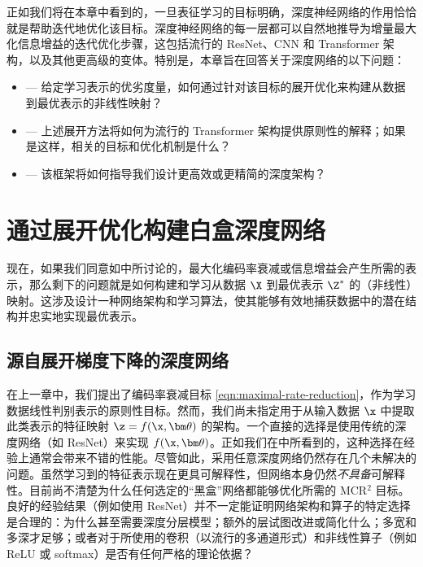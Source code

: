 \documentclass[../../book-main_zh.tex]{subfiles}
\begin{document}
正如我们将在本章中看到的，一旦表征学习的目标明确，深度神经网络的作用恰恰就是帮助迭代地优化该目标。深度神经网络的每一层都可以自然地推导为增量最大化信息增益的迭代优化步骤，这包括流行的 ResNet、CNN 和 Transformer 架构，以及其他更高级的变体。特别是，本章旨在回答关于深度网络的以下问题：
\begin{itemize}
    \item {} --- 给定学习表示的优劣度量，如何通过针对该目标的展开优化来构建从数据到最优表示的非线性映射？
    \item {} --- 上述展开方法将如何为流行的 Transformer 架构提供原则性的解释；如果是这样，相关的目标和优化机制是什么？
    \item {} --- 该框架将如何指导我们设计更高效或更精简的深度架构？
\end{itemize}

\section{通过展开优化构建白盒深度网络}\label{sec:chap4-white-box-model-via-unrolling}

现在，如果我们同意如中所讨论的，最大化编码率衰减或信息增益会产生所需的表示，那么剩下的问题就是如何构建和学习从数据 $\X$ 到最优表示 $\Z^*$ 的（非线性）映射。这涉及设计一种网络架构和学习算法，使其能够有效地捕获数据中的潜在结构并忠实地实现最优表示。

\subsection{源自展开梯度下降的深度网络}

在上一章中，我们提出了编码率衰减目标 \eqref{eqn:maximal-rate-reduction}，作为学习数据线性判别表示的原则性目标。然而，我们尚未指定用于从输入数据 $\x$ 中提取此类表示的特征映射 $\z = f(\x, \bm \theta)$ 的架构。一个直接的选择是使用传统的深度网络（如 ResNet）来实现 $f(\x, \bm \theta)$。正如我们在中所看到的，这种选择在经验上通常会带来不错的性能。尽管如此，采用任意深度网络仍然存在几个未解决的问题。虽然学习到的特征表示现在更具可解释性，但网络本身仍然{\em 不具备}可解释性。目前尚不清楚为什么任何选定的“黑盒”网络都能够优化所需的 MCR$^2$ 目标。良好的经验结果（例如使用 ResNet）并不一定能证明网络架构和算子的特定选择是合理的：为什么甚至需要深度分层模型；额外的层试图改进或简化什么；多宽和多深才足够；或者对于所使用的卷积（以流行的多通道形式）和非线性算子（例如 ReLU 或 softmax）是否有任何严格的理论依据？
\end{document}

